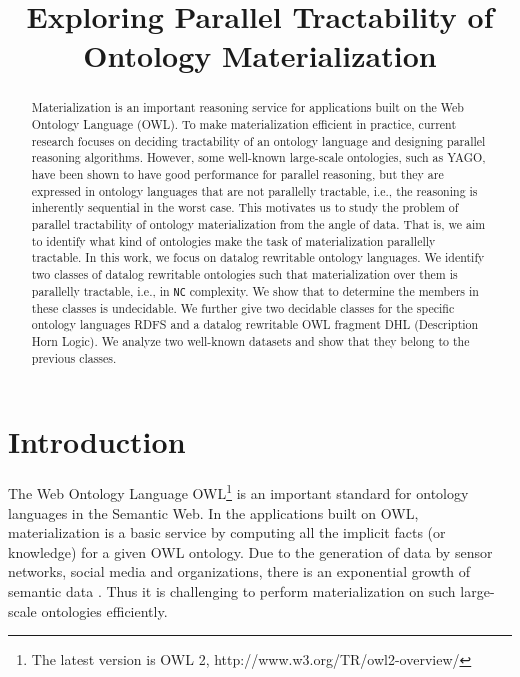\documentclass{article}
\title{Exploring Parallel Tractability of Ontology Materialization}
\begin{document}
\maketitle
\newtheorem{lemma}{Lemma}
\newtheorem{theorem}{Theorem}
\newtheorem{problem}{Problem}
\newtheorem{property}{Property}
\newtheorem{definition}{Definition}
\newtheorem{invariant}{Invariant}
\newtheorem{example}{Example}
\newtheorem{remark}{Remark}
\newtheorem{corollary}{Corollary}

\begin{abstract}
Materialization is an important reasoning service for applications built on the Web Ontology Language (OWL). To make materialization efficient in practice, current research focuses on deciding tractability of an ontology language and designing parallel reasoning algorithms. However, some well-known large-scale ontologies, such as YAGO, have been shown to have good performance for parallel reasoning, but they are expressed in ontology languages that are not parallelly tractable, i.e., the reasoning is inherently sequential in the worst case. This motivates us to study the problem of parallel tractability of ontology materialization from the angle of data. That is, we aim to identify what kind of ontologies make the task of materialization parallelly tractable. In this work, we focus on datalog rewritable ontology languages. We identify two classes of datalog rewritable ontologies such that materialization over them is parallelly tractable, i.e., in \texttt{NC} complexity. We show that to determine the members in these classes is undecidable. We further give two decidable classes for the specific ontology languages RDFS and a datalog rewritable OWL fragment DHL (Description Horn Logic). We analyze two well-known datasets and show that they belong to the previous classes.
\end{abstract}



\section{Introduction}
The Web Ontology Language OWL\footnote{The latest version is OWL 2, http://www.w3.org/TR/owl2-overview/} is an important standard for ontology languages in the Semantic Web. In the applications built on OWL, materialization is a basic service by computing all the implicit facts (or knowledge) for a given OWL ontology. Due to the generation of data by sensor networks, social media and organizations, there is an exponential growth of semantic data \cite{DBLP:conf/wims/MeuselBP15}. Thus it is challenging to perform materialization on such large-scale ontologies efficiently.
\end{document}
